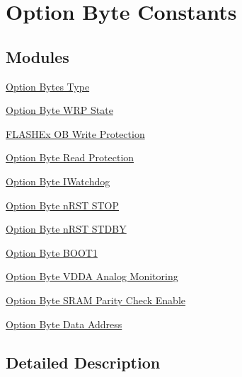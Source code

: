 \hypertarget{group___f_l_a_s_h_ex___option_byte___constants}{}\section{Option Byte Constants}
\label{group___f_l_a_s_h_ex___option_byte___constants}
\subsection*{Modules}
\begin{DoxyCompactItemize}
\item 
\hyperlink{group___f_l_a_s_h_ex___o_b___type}{Option Bytes Type}
\item 
\hyperlink{group___f_l_a_s_h_ex___o_b___w_r_p___state}{Option Byte W\+R\+P State}
\item 
\hyperlink{group___f_l_a_s_h_ex___o_b___write___protection}{F\+L\+A\+S\+H\+Ex O\+B Write Protection}
\item 
\hyperlink{group___f_l_a_s_h_ex___o_b___read___protection}{Option Byte Read Protection}
\item 
\hyperlink{group___f_l_a_s_h_ex___o_b___i_watchdog}{Option Byte I\+Watchdog}
\item 
\hyperlink{group___f_l_a_s_h_ex___o_b__n_r_s_t___s_t_o_p}{Option Byte n\+R\+S\+T S\+T\+OP}
\item 
\hyperlink{group___f_l_a_s_h_ex___o_b__n_r_s_t___s_t_d_b_y}{Option Byte n\+R\+S\+T S\+T\+D\+BY}
\item 
\hyperlink{group___f_l_a_s_h_ex___o_b___b_o_o_t1}{Option Byte B\+O\+O\+T1}
\item 
\hyperlink{group___f_l_a_s_h_ex___o_b___v_d_d_a___analog___monitoring}{Option Byte V\+D\+D\+A Analog Monitoring}
\item 
\hyperlink{group___f_l_a_s_h_ex___o_b___r_a_m___parity___check___enable}{Option Byte S\+R\+A\+M Parity Check Enable}
\item 
\hyperlink{group___f_l_a_s_h_ex___o_b___data___address}{Option Byte Data Address}
\end{DoxyCompactItemize}


\subsection{Detailed Description}
